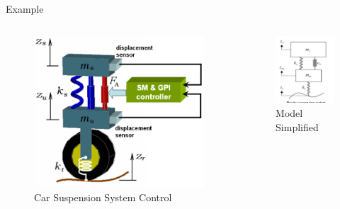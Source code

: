 \documentclass[10pt]{beamer}
\begin{document}
\begin{frame}{Example}
\begin{columns}[T,onlytextwidth]
\begin{figure}
    \centering
    \includegraphics[scale=0.2]{controlSuspension.png}
    \caption{Car Suspension System Control}
    \label{fig:my_label2}
\end{figure}
\begin{figure}
    \centering
    \includegraphics[scale=2.0]{suspension.jpg}
    \caption{Model Simplified}
    \label{fig:my_label3}
\end{figure}
\end{columns}
\end{frame}
\end{document}
